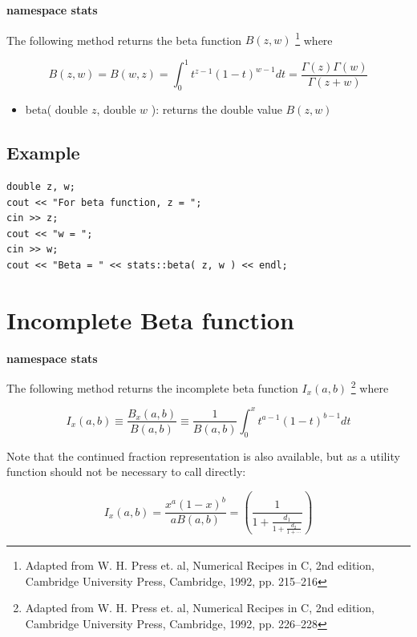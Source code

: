 \documentclass{report}
\begin{document}
{\bf namespace stats}

The following method returns the beta function $B(z,w)$
\footnote{Adapted from W. H. Press et. al, Numerical Recipes in C, 2nd
edition, Cambridge University Press, Cambridge, 1992, pp. 215--216}
where 

\begin{equation}\label{Blbl}
B(z,w) = B(w,z) = \int_0^1t^{z-1}(1-t)^{w-1}dt = \frac{\Gamma(z)\Gamma
(w)}{\Gamma(z+w)}
\end{equation}

\begin{itemize}
\item beta( double $z$, double $w$ ): returns the double value
$B(z,w)$
\end{itemize}

\subsection{Example}
\begin{verbatim}
double z, w;
cout << "For beta function, z = ";
cin >> z;
cout << "w = ";
cin >> w;
cout << "Beta = " << stats::beta( z, w ) << endl;
\end{verbatim}

\section{Incomplete Beta function}

{\bf namespace stats}

The following method returns the incomplete beta function $I_x(a,b)$
\footnote{Adapted from W. H. Press et. al, Numerical Recipes in C, 2nd
edition, Cambridge University Press, Cambridge, 1992, pp. 226--228}
where 

\begin{equation}\label{incompBlbl}
I_x(a,b) \equiv \frac{B_x(a,b)}{B(a,b)} \equiv \frac{1}{B(a,b)}\int_0^
xt^{a-1}(1-t)^{b-1}dt
\end{equation}

Note that the continued fraction representation is also available, but
as a utility function should not be necessary to call directly:

\begin{equation}
I_x(a,b) = \frac{x^a(1-x)^b}{aB(a,b)} = \left(\frac{1}{1+\frac{d_1}{1+
\frac{d_2}{1+\cdots}}}\right)
\end{equation}
\end{document}
